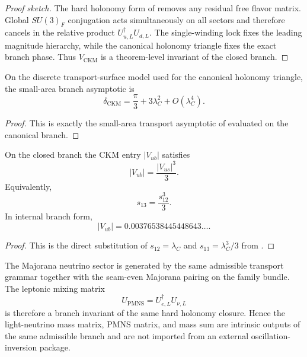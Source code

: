 \begin{proof}[Proof sketch]
The hard holonomy form of  removes any residual free flavor
matrix. Global $SU(3)_F$ conjugation acts simultaneously on all sectors and therefore cancels in
the relative product $U_{u,L}^\dagger U_{d,L}$. The single-winding lock fixes the leading magnitude
hierarchy, while the canonical holonomy triangle fixes the exact branch phase. Thus
$V_{\mathrm{CKM}}$ is a theorem-level invariant of the closed branch.
\end{proof}

\begin{proposition}
\label{prop:ckm-phase-asymptotic}
On the discrete transport-surface model used for the canonical holonomy triangle, the small-area
branch asymptotic is
\begin{equation}
\label{eq:ckm-phase}
\delta_{\mathrm{CKM}}=\frac{\pi}{3}+3\lambda_C^2+O(\lambda_C^4).
\end{equation}
\end{proposition}

\begin{proof}
This is exactly the small-area transport asymptotic of
 evaluated on the canonical branch.
\end{proof}

\begin{corollary}
\label{cor:cubic-vub-law}
On the closed branch the CKM entry $|V_{ub}|$ satisfies
\[
|V_{ub}|=\frac{|V_{us}|^3}{3}.
\]
Equivalently,
\[
s_{13}=\frac{s_{12}^3}{3}.
\]
In internal branch form,
\[
|V_{ub}|=0.00376538445448643\ldots.
\]
\end{corollary}

\begin{proof}
This is the direct substitution of $s_{12}=\lambda_C$ and
$s_{13}=\lambda_C^3/3$ from .
\end{proof}

\begin{theorem}
\label{thm:neutrino-closure}
The Majorana neutrino sector is generated by the same admissible transport grammar together
with the seam-even Majorana pairing on the family bundle. The leptonic mixing matrix
\[
U_{\mathrm{PMNS}}=U_{e,L}^\dagger U_{\nu,L}
\]
is therefore a branch invariant of the same hard holonomy closure. Hence the light-neutrino mass
matrix, PMNS matrix, and mass sum are intrinsic outputs of the same admissible branch and are not
imported from an external oscillation-inversion package.
\end{theorem}

